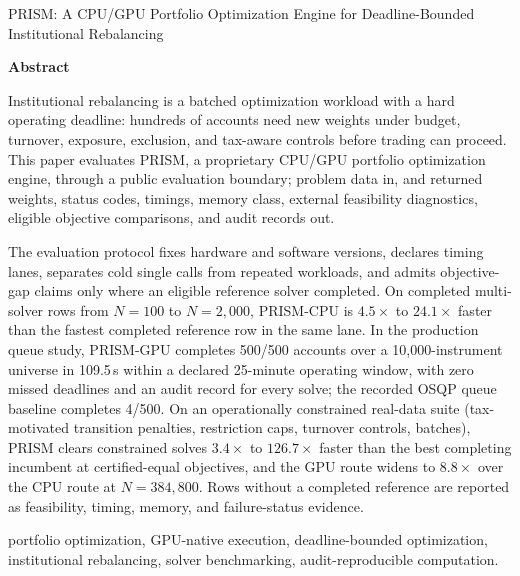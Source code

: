 \documentclass[10pt,a4paper]{extarticle}
\begin{document}
\thispagestyle{firstpage}
\vspace{2pt}

\ACmaketitle%
  {PRISM: A CPU/GPU Portfolio Optimization Engine}%
  {for Deadline-Bounded Institutional Rebalancing}

\ACauthorline

\begin{abstractbox}
\begin{center}{\sffamily\bfseries\color{ACnavy}Abstract}\end{center}%
\vspace{-2pt}
\noindent{\color{ACline}\rule{\linewidth}{0.4pt}}\par
\vspace{4pt}
\small
Institutional rebalancing is a batched optimization workload with a hard
operating deadline: hundreds of accounts need new weights under budget,
turnover, exposure, exclusion, and tax-aware controls before trading can
proceed. This paper evaluates PRISM, a proprietary CPU/GPU portfolio
optimization engine, through a public evaluation boundary; problem data in,
and returned weights, status codes, timings, memory class, external
feasibility diagnostics, eligible objective comparisons, and audit records
out.

The evaluation protocol fixes hardware and software versions, declares timing
lanes, separates cold single calls from repeated workloads, and admits
objective-gap claims only where an eligible reference solver completed. On
completed multi-solver rows from $N{=}100$ to $N{=}2{,}000$, PRISM-CPU is
$4.5\times$ to $24.1\times$ faster than the fastest completed reference row in
the same lane. In the production queue study, PRISM-GPU completes 500/500
accounts over a 10,000-instrument universe in 109.5\,s within a declared
25-minute operating window, with zero missed deadlines and an audit record for
every solve; the recorded OSQP queue baseline completes 4/500. On an
operationally constrained real-data suite (tax-motivated transition
penalties, restriction caps, turnover controls, batches), PRISM clears constrained
solves $3.4\times$ to $126.7\times$ faster than the best completing
incumbent at certified-equal objectives, and the GPU route widens to $8.8\times$ over
the CPU route at $N{=}384{,}800$. Rows without a completed reference are
reported as feasibility, timing, memory, and failure-status evidence.
\end{abstractbox}

\vspace{0.2em}
{\small{}\enspace
portfolio optimization, GPU-native execution,
deadline-bounded optimization, institutional rebalancing, solver benchmarking,
audit-reproducible computation.}
\end{document}
